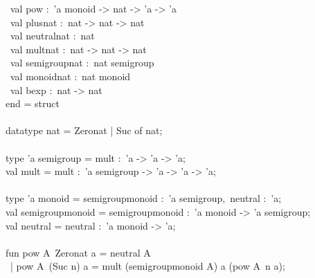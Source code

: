 \begin{isabellebody}
\begin{isamarkuptext}
\hspace*{0pt} ~val pow :~'a monoid -> nat -> 'a -> 'a\\
\hspace*{0pt} ~val plus{}nat :~nat -> nat -> nat\\
\hspace*{0pt} ~val neutral{}nat :~nat\\
\hspace*{0pt} ~val mult{}nat :~nat -> nat -> nat\\
\hspace*{0pt} ~val semigroup{}nat :~nat semigroup\\
\hspace*{0pt} ~val monoid{}nat :~nat monoid\\
\hspace*{0pt} ~val bexp :~nat -> nat\\
\hspace*{0pt}end = struct\\
\hspace*{0pt}\\
\hspace*{0pt}datatype nat = Zero{}nat | Suc of nat;\\
\hspace*{0pt}\\
\hspace*{0pt}type 'a semigroup = {}mult :~'a -> 'a -> 'a{};\\
\hspace*{0pt}val mult = {}mult :~'a semigroup -> 'a -> 'a -> 'a;\\
\hspace*{0pt}\\
\hspace*{0pt}type 'a monoid = {}semigroup{}monoid :~'a semigroup,~neutral :~'a{};\\
\hspace*{0pt}val semigroup{}monoid = {}semigroup{}monoid :~'a monoid -> 'a semigroup;\\
\hspace*{0pt}val neutral = {}neutral :~'a monoid -> 'a;\\
\hspace*{0pt}\\
\hspace*{0pt}fun pow A{}~Zero{}nat a = neutral A{}\\
\hspace*{0pt} ~| pow A{}~(Suc n) a = mult (semigroup{}monoid A{}) a (pow A{}~n a);\\

\end{isamarkuptext}
\end{isabellebody}
